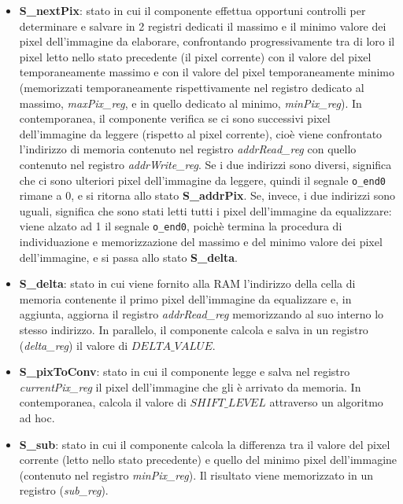 \documentclass{article}
\begin{document}
\begin{itemize}
	\item \textbf{S\_nextPix}: stato in cui il componente effettua opportuni controlli per determinare e salvare in 2 registri dedicati il massimo e il minimo valore dei pixel dell'immagine da elaborare, confrontando progressivamente tra di loro il pixel letto nello stato precedente (il pixel corrente) con il valore del pixel temporaneamente massimo e con il valore del pixel temporaneamente minimo (memorizzati temporaneamente rispettivamente nel registro dedicato al massimo, \textit{maxPix\_reg}, e in quello dedicato al minimo, \textit{minPix\_reg}). In contemporanea, il componente verifica se ci sono successivi pixel dell'immagine da leggere (rispetto al pixel corrente), cioè viene confrontato l'indirizzo di memoria contenuto nel registro \textit{addrRead\_reg} con quello contenuto nel registro \textit{addrWrite\_reg}. Se i due indirizzi sono diversi, significa che ci sono ulteriori pixel dell'immagine da leggere, quindi il segnale \verb^o_end0^ rimane a 0, e si ritorna allo stato \textbf{S\_addrPix}. Se, invece, i due indirizzi sono uguali, significa che sono stati letti tutti i pixel dell'immagine da equalizzare: viene alzato ad 1 il segnale \verb^o_end0^, poichè termina la procedura di individuazione e memorizzazione del massimo e del minimo valore dei pixel dell'immagine, e si passa allo stato \textbf{S\_delta}.
	\item \textbf{S\_delta}: stato in cui viene fornito alla RAM l'indirizzo della cella di memoria contenente il primo pixel dell'immagine da equalizzare e, in aggiunta, aggiorna il registro \textit{addrRead\_reg} memorizzando al suo interno lo stesso indirizzo. In parallelo, il componente calcola e salva in un registro (\textit{delta\_reg}) il valore di $DELTA\_VALUE$.
	\item \textbf{S\_pixToConv}: stato in cui il componente legge e salva nel registro \textit{currentPix\_reg} il pixel dell'immagine che gli è arrivato da memoria. In contemporanea, calcola il valore di $SHIFT\_LEVEL$ attraverso un algoritmo ad hoc.
	\item \textbf{S\_sub}: stato in cui il componente calcola la differenza tra il valore del pixel corrente (letto nello stato precedente) e quello del minimo pixel dell'immagine (contenuto nel registro \textit{minPix\_reg}). Il risultato viene memorizzato in un registro (\textit{sub\_reg}).

\end{itemize}
\end{document}

